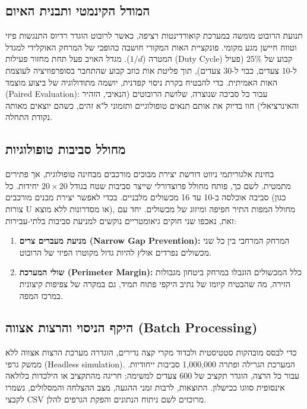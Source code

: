 \documentclass[12pt, a4paper]{article}
\begin{document}
\subsection{המודל הקינמטי ותבנית האיום}
תנועת הרובוט מומשה במערכת קואורדינטות רציפה, כאשר לרובוט הוגדר רדיוס התנגשות פיזי וטווח חיישן מגע מקומי. פונקציית האות המקורי חושבה כהופכי של המרחק האוקלידי למגדל המטרה ($1/d$). מגדל האויב פעל תחת מחזור פעילות (\textenglish{Duty Cycle}) קבוע של 25\% (פעיל ל-10 צעדים, כבוי ל-30 צעדים), תוך פליטת אות כוזב קבוע שהתחבר בסופרפוזיציה לעוצמת האות האמיתית.
כדי להבטיח בקרת ניסוי קפדנית, יושמה מתודולוגיה של ביצוע מוצמד (\textenglish{Paired Evaluation}): עבור כל סביבה שנוצרה, שלושת הרובוטים (הנאיבי, הזהיר והאינרציאלי) חוו בדיוק את אותם תנאים טופולוגיים ותזמוני ל"א זהים, כשהם יוצאים מאותה נקודת התחלה.

\subsection{מחולל סביבות טופולוגיות}
בחינת אלגוריתמי ניווט דורשת יצירת מבוכים מורכבים מבחינה טופולוגית, אך פתירים מתמטית. לשם כך, פותח מחולל פרוצדורלי שייצר סביבות שטח בגודל $20 \times 20$ יחידות. כל סביבה אוכלסה ב-10 עד 16 מכשולים מלבניים. 
בכדי לאפשר יצירת מבנים מורכבים (כגון צורות U או מסדרונות ללא מוצא), מחולל המפות התיר חפיפה ומיזוג של מכשולים. יחד עם זאת, נאכפו שני חוקים גיאומטריים נוקשים למניעת סביבות בלתי-עבירות:
\begin{enumerate}
    \item \textbf{מניעת מעברים צרים (\textenglish{Narrow Gap Prevention}):} המרחק המרחבי בין כל שני מכשולים נפרדים אולץ להיות גדול מקוטרו הפיזי של הרובוט.
    \item \textbf{שולי המערכת (\textenglish{Perimeter Margin}):} כלל המכשולים הוגבלו במרחק ביטחון מגבולות הזירה, מה שהבטיח קיומו של נתיב היקפי פתוח תמיד, גם במקרה של צפיפות קיצונית במרכז המפה.
\end{enumerate}

\subsection{היקף הניסוי והרצות אצווה (\textenglish{Batch Processing})}
כדי לבסס מובהקות סטטיסטית ולכדוד מקרי קצה נדירים, הוגדרה מערכת הרצות אצווה ללא ממשק גרפי (\textenglish{Headless simulation}). המערכת הגרילה ופתרה 1,000,000 סביבות ייחודיות. עבור כל הרצה, הוגדר תקציב של 600 צעדים למשימה; חריגה מהתקציב או הילכדות בלולאה אינסופית סווגו ככישלון. התוצאות, לרבות זמני ההגעה, מצב ההצלחה והמסלולים, נשמרו לקבצי \textenglish{CSV} מרוכזים לשם ניתוח הנתונים והפקת הגרפים להלן.
\end{document}
